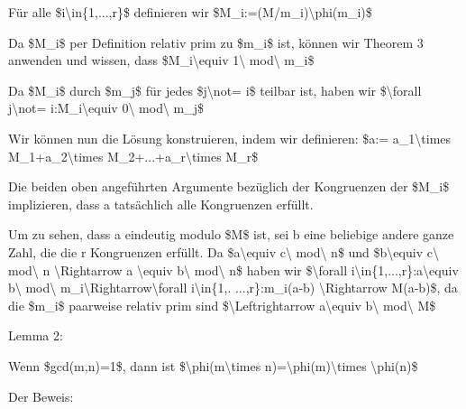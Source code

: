 \documentclass[a4paper]{article}
\begin{document}
\begin{multicols}{3}
\begin{itemize*}
\begin{itemize*}
                  \begin{itemize*} \item Für alle \$i\textbackslash in\{1,...,r\}\$ definieren wir \$M\_i:=(M/m\_i)\textbackslash phi(m\_i)\$ \item Da \$M\_i\$ per Definition relativ prim zu \$m\_i\$ ist, können wir Theorem 3 anwenden und wissen, dass \$M\_i\textbackslash equiv 1\textbackslash{} mod\textbackslash{} m\_i\$ \item Da \$M\_i\$ durch \$m\_j\$ für jedes \$j\textbackslash not= i\$ teilbar ist, haben wir \$\textbackslash forall j\textbackslash not= i:M\_i\textbackslash equiv 0\textbackslash{} mod\textbackslash{} m\_j\$ \item Wir können nun die Lösung konstruieren, indem wir definieren: \$a:= a\_1\textbackslash times M\_1+a\_2\textbackslash times M\_2+...+a\_r\textbackslash times M\_r\$ \item Die beiden oben angeführten Argumente bezüglich der Kongruenzen der \$M\_i\$ implizieren, dass a tatsächlich alle Kongruenzen erfüllt. \item Um zu sehen, dass a eindeutig modulo \$M\$ ist, sei b eine beliebige andere ganze Zahl, die die r Kongruenzen erfüllt. Da \$a\textbackslash equiv c\textbackslash{} mod\textbackslash{} n\$ und \$b\textbackslash equiv c\textbackslash{} mod\textbackslash{} n \textbackslash Rightarrow a \textbackslash equiv b\textbackslash{} mod\textbackslash{} n\$ haben wir \$\textbackslash forall i\textbackslash in\{1,...,r\}:a\textbackslash equiv b\textbackslash{} mod\textbackslash{} m\_i\textbackslash Rightarrow\textbackslash forall i\textbackslash in\{1,. ...,r\}:m\_i\textbar(a-b) \textbackslash Rightarrow M\textbar(a-b)\$, da die \$m\_i\$ paarweise relativ prim sind \$\textbackslash Leftrightarrow a\textbackslash equiv b\textbackslash{} mod\textbackslash{} M\$ \end{itemize*}
            \end{itemize*}
            \item Lemma 2:
            \begin{itemize*}
                  \item Wenn \$gcd(m,n)=1\$, dann ist \$\textbackslash phi(m\textbackslash times n)=\textbackslash phi(m)\textbackslash times \textbackslash phi(n)\$
                  \item Der Beweis:

\end{itemize*}
\end{itemize*}
\end{multicols}
\end{document}
